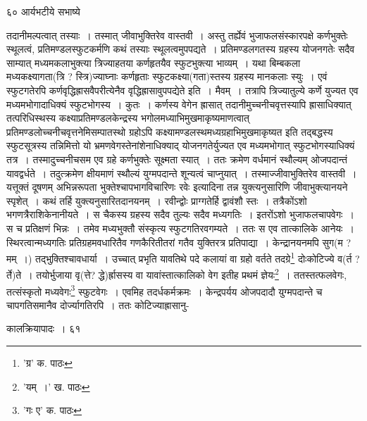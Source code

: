 \documentclass[11pt, openany]{book}
\begin{document}
{{{{\newpage

\vspace{3cm} ६०\hspace{4cm} आर्यभटीये सभाष्ये 

\vspace{0.3cm}
\noindent तदानीमल्पत्वात् तस्याः~। तस्मात् जीवाभुक्तिरेव वास्तवी~। अस्तु तर्ह्येवं भुजाफलसंस्कारपक्षे कर्णभुक्तेः स्थूलत्वं, प्रतिमण्डलस्फुटकर्मणि कथं तस्याः स्थूलत्वमुपपद्यते~। प्रतिमण्डलगतस्य ग्रहस्य योजनगतेः सदैव साम्यात् मध्यमकलाभुक्त्या त्रिज्याहतया कर्णहृतयैव स्फुटभुक्त्या भाव्यम्~। यथा बिम्बकला मध्यकक्ष्यागता(त्रि ? स्त्रि)ज्याघ्नाः कर्णहृताः स्फुटकक्ष्या(गता)स्तस्य ग्रहस्य मानकलाः स्युः~। एवं स्फुटगतेरपि कर्णवृद्धिह्रासवैपरीत्येनैव वृद्धिह्रासावुपपद्येते इति~। मैवम्~। तत्रापि त्रिज्यातुल्ये कर्णे युज्यत एव मध्यमभोगादाधिक्यं स्फुटभोगस्य~। कुतः~। कर्णस्य वेगेन ह्रासात् तदानीमुच्चनीचवृत्तस्यापि ह्रासाधिक्यात् तत्परिधिस्थस्य कक्ष्याप्रतिमण्डलकेन्द्रस्य भगोलमध्याभिमुखमाकृष्यमाणत्वात् प्रतिमण्डलोच्चनीचवृत्तनेमिसम्पातस्थो ग्रहोऽपि कक्ष्यामण्डलस्थमध्यग्रहाभिमुखमाकृष्यत इति तद्बद्धस्य स्फुटसूत्रस्य तन्निमित्तो यो भ्रमणवेगस्तेनांशेनाधिक्याद् योजनगतेर्युज्यत एव मध्यमभोगात् स्फुटभोगस्याधिक्यं तत्र~। तस्मादुच्चनीचसम एव ग्रहे कर्णभुक्तेः सूक्ष्मता स्यात्~। ततः क्रमेण वर्धमानं स्थौल्यम् ओजपदान्तं यावद्वर्धते~। तदुत्क्रमेण क्षीयमाणं स्थौल्यं युग्मपदान्ते
शून्यत्वं चाप्नुयात्~। तस्माज्जीवाभुक्तिरेव वास्तवी~। यत्तूक्तं दूषणम् {\qt अभिन्नरूपता भुक्तेश्चापभागविचारिणः रवेः} इत्यादिना तन्न युक्त्यनुसारिणि जीवाभुक्त्यानयने स्पृशेत्~। कथं तर्हि युक्त्यनुसारितदानयनम्~। रवीन्द्वोः प्राग्गतेर्हि द्वावंशौ स्तः~। तत्रैकोंऽशो भगणत्रैराशिकेनानीयते~। स चैकस्य ग्रहस्य सदैव तुल्यः सदैव मध्यगतिः~। इतरोंऽशो भुजाफलचापवेगः~। स च प्रतिक्षणं भिन्नः~। तमेव मध्यभुक्तौ संस्कृत्य स्फुटगतिरवगम्यते~। ततः स एव तात्कालिके आनेयः~। स्थिरत्वान्मध्यगतिः प्रतिग्रहमवधारितैव गणकैरितीतरां गतैव युक्तिरत्र प्रतिपाद्या~। केन्द्रानयनमपि सुग(म ? मम्~।) तद्भुक्तिश्चावधार्या~। उच्चात् प्रभृति यावतिथे पदे कलायां वा ग्रहो वर्तते तदग्रे\renewcommand{\thefootnote}{१}\footnote{'ग्र' क. पाठः} दोःकोटिज्ये व(र्त ? र्ते)ते~। तयोर्भुजाया वृ(त्ते?
द्धे)र्ह्रासस्य वा यावांस्तात्कालिको वेग इतीह प्रथमं ज्ञेयः\renewcommand{\thefootnote}{२}\footnote{'यम्~।' ख. पाठः}~। ततस्तत्फलवेगः, तत्संस्कृतो मध्यवेगः\renewcommand{\thefootnote}{३}\footnote{'गः ए' क. पाठः} स्फुटवेगः~। एवमिह तदर्धकर्मक्रमः~। केन्द्रपर्यय ओजपदादौ युग्मपदान्ते च चापगतिसमानैव दोर्ज्यागतिरपि~। ततः कोटिज्याह्रासानु-

\newpage

\vspace{3cm} \hspace{4cm}कालक्रियापादः~। \hspace{4cm}६१

}}}}
\end{document}
